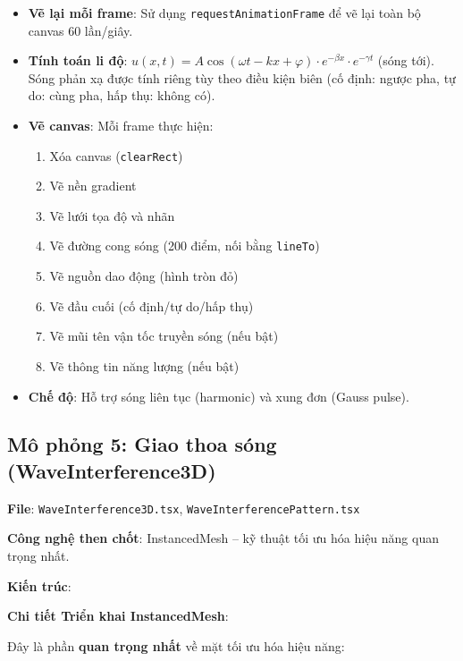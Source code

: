 \begin{itemize}
    \item \textbf{Vẽ lại mỗi frame}: Sử dụng \texttt{requestAnimationFrame} để vẽ lại toàn bộ canvas 60 lần/giây.
    
    \item \textbf{Tính toán li độ}: $u(x,t) = A\cos(\omega t - kx + \varphi) \cdot e^{-\beta x} \cdot e^{-\gamma t}$ (sóng tới). Sóng phản xạ được tính riêng tùy theo điều kiện biên (cố định: ngược pha, tự do: cùng pha, hấp thụ: không có).
    
    \item \textbf{Vẽ canvas}: Mỗi frame thực hiện:
    \begin{enumerate}
        \item Xóa canvas (\texttt{clearRect})
        \item Vẽ nền gradient
        \item Vẽ lưới tọa độ và nhãn
        \item Vẽ đường cong sóng (200 điểm, nối bằng \texttt{lineTo})
        \item Vẽ nguồn dao động (hình tròn đỏ)
        \item Vẽ đầu cuối (cố định/tự do/hấp thụ)
        \item Vẽ mũi tên vận tốc truyền sóng (nếu bật)
        \item Vẽ thông tin năng lượng (nếu bật)
    \end{enumerate}
    
    \item \textbf{Chế độ}: Hỗ trợ sóng liên tục (harmonic) và xung đơn (Gauss pulse).
\end{itemize}

\subsection{Mô phỏng 5: Giao thoa sóng (WaveInterference3D)}

\textbf{File}: \texttt{WaveInterference3D.tsx}, \texttt{WaveInterferencePattern.tsx}

\textbf{Công nghệ then chốt}: InstancedMesh – kỹ thuật tối ưu hóa hiệu năng quan trọng nhất.

\textbf{Kiến trúc}:



\textbf{Chi tiết Triển khai InstancedMesh}:

Đây là phần \textbf{quan trọng nhất} về mặt tối ưu hóa hiệu năng:

